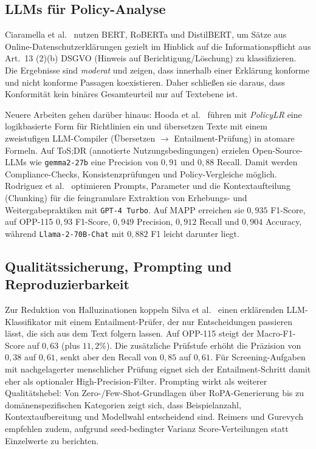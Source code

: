 \subsection*{\acp{LLM} für Policy-Analyse}

Ciaramella et al.\ \cite{ciaramella2022leveraging} nutzen BERT, RoBERTa und DistilBERT, um Sätze aus Online-Datenschutzerklärungen gezielt im Hinblick auf die Informationspflicht aus Art.~13 (2)(b) \ac{DSGVO} (Hinweis auf Berichtigung/Löschung) zu klassifizieren. Die Ergebnisse sind \emph{moderat} und zeigen, dass innerhalb einer Erklärung konforme und nicht konforme Passagen koexistieren. Daher schließen sie daraus, dass Konformität kein binäres Gesamteurteil nur auf Textebene ist.

Neuere Arbeiten gehen darüber hinaus: Hooda et al.\ \cite{hooda2024policylr} führen mit \emph{PolicyLR} eine logikbasierte Form für Richtlinien ein und übersetzen Texte mit einem zweistufigen \ac{LLM}-Compiler (Übersetzen $\to$ Entailment-Prüfung) in atomare Formeln. Auf ToS;DR (annotierte Nutzungsbedingungen) erzielen Open-Source-\acp{LLM} wie \texttt{gemma2-27b} eine Precision von $0{,}91$ und $0{,}88$ Recall. Damit werden Compliance-Checks, Konsistenzprüfungen und Policy-Vergleiche möglich. Rodriguez et al.\ \cite{rodriguez2024largelanguagemodels} optimieren Prompts, Parameter und die Kontextaufteilung (Chunking) für die feingranulare Extraktion von Erhebungs- und Weitergabepraktiken mit \texttt{GPT-4~Turbo}. Auf MAPP erreichen sie $0{,}935$ F1-Score, auf OPP-115 $0{,}93$ F1-Score, $0{,}949$ Precision, $0{,}912$ Recall und $0{,}904$ Accuracy, während \texttt{Llama-2-70B-Chat} mit $0{,}882$ F1 leicht darunter liegt.

\subsection*{Qualitätssicherung, Prompting und Reproduzierbarkeit}

Zur Reduktion von Halluzinationen koppeln Silva et al.\ \cite{silva2024entailment} einen erklärenden \ac{LLM}-Klassifikator mit einem Entailment-Prüfer, der nur Entscheidungen passieren lässt, die sich aus dem Text folgern lassen. Auf OPP-115 steigt der Macro-F1-Score auf $0{,}63$ (plus $11{,}2$\%). Die zusätzliche Prüfstufe erhöht die Präzision von $0{,}38$ auf $0{,}61$, senkt aber den Recall von $0{,}85$ auf $0{,}61$. Für Screening-Aufgaben mit nachgelagerter menschlicher Prüfung eignet sich der Entailment-Schritt damit eher als optionaler High-Precision-Filter. Prompting wirkt als weiterer Qualitätshebel: Von Zero-/Few-Shot-Grundlagen \cite{brown2020fewshot,liu2023prompting} über RoPA-Generierung \cite{pragyan2024toward} bis zu domänenspezifischen Kategorien \cite{schwerin2024systematic} zeigt sich, dass Beispielanzahl, Kontextaufbereitung und Modellwahl entscheidend sind. Reimers und Gurevych \cite{reimers2017reporting} empfehlen zudem, aufgrund seed-bedingter Varianz Score-Verteilungen statt Einzelwerte zu berichten.

